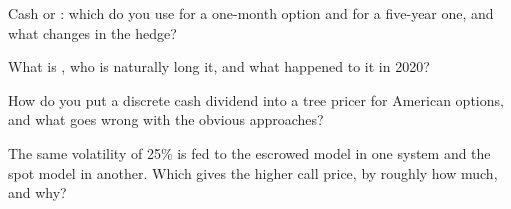 \begin{interviewq}\label{iq:dv:dividends-borrow-and-forwards:3}
Cash or : which do you use for a one-month option and for a
five-year one, and what changes in the hedge?
\end{interviewq}

\begin{interviewq}\label{iq:dv:dividends-borrow-and-forwards:4}
What is , who is naturally long it, and what happened to it in 2020?
\end{interviewq}

\begin{interviewq}\label{iq:dv:dividends-borrow-and-forwards:5}
How do you put a discrete cash dividend into a tree pricer for American options, and
what goes wrong with the obvious approaches?
\end{interviewq}

\begin{interviewq}\label{iq:dv:dividends-borrow-and-forwards:6}
The same volatility of 25\% is fed to the escrowed model in one system and the spot model
in another. Which gives the higher call price, by roughly how much, and why?
\end{interviewq}
